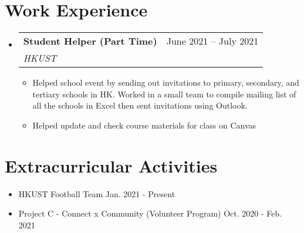 \documentclass[letterpaper,12pt]{article}
\makeatletter
\newcommand{\resumeItem}[1]{
  \item\small{
    {#1 \vspace{-2pt}}
  }
}
\newcommand{\resumeSubheading}[4]{
  \vspace{-2pt}\item
    \begin{tabular*}{0.97\textwidth}[t]{l@{\extracolsep{\fill}}r}
      \textbf{#1} & #2 \\
      \textit{\small#3} & \textit{\small #4} \\
    \end{tabular*}\vspace{-7pt}
}
\newcommand{\resumeSubHeadingListStart}{\begin{itemize}[leftmargin=0.15in, label={}]}
\newcommand{\resumeSubHeadingListEnd}{\end{itemize}}
\newcommand{\resumeItemListStart}{\begin{itemize}}
\newcommand{\resumeItemListEnd}{\end{itemize}\vspace{-5pt}}
\makeatother
\begin{document}
\section{Work Experience}
  \resumeSubHeadingListStart

    \resumeSubheading
      {Student Helper (Part Time)}{June 2021 -- July 2021}
      {HKUST}{}
      \resumeItemListStart 
        \resumeItem{\normalsize{Helped school event by sending out invitations to primary, secondary, and tertiary schools in HK. Worked in a small team to compile mailing list of all the schools in Excel then sent invitations using Outlook.}}
        \resumeItem{\normalsize{Helped update and check course materials for class on Canvas}}
      \resumeItemListEnd

  \resumeSubHeadingListEnd

\section{Extracurricular Activities}
    \begin{itemize}[itemsep=-2pt, parsep=5pt] 
        \item  {HKUST Football Team \hfill Jan. 2021 - Present}
        \item {Project C - Connect x Community (Volunteer Program) \hfill Oct. 2020 - Feb. 2021}
    \end{itemize}
\end{document}
